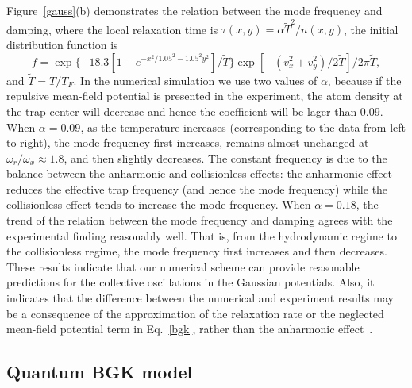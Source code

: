 Figure~\ref{gauss}(b) demonstrates the relation between the mode
frequency and damping, where the local relaxation time is
$\tau(x,y)=\alpha \widetilde{T}^2/n(x,y)$, the initial
distribution function is
\begin{equation}
f=\exp\{-18.3[1-e^{-x^2/1.05^2-1.05^2y^2}]/\widetilde{T}\}\exp[-(v_x^2+v_y^2)/2\widetilde{T}]/2\pi\widetilde{T},
\end{equation}
and $\widetilde{T}=T/T_F$. {In the numerical simulation we use two
	values of $\alpha$, because if the repulsive mean-field potential
	is presented in the experiment, the atom density at the trap
	center will decrease and hence the coefficient will be lager than
	$0.09$. When $\alpha=0.09$, as the temperature increases
	(corresponding to the data from left to right), the mode frequency
	first increases, remains almost unchanged at
	$\omega_r/\omega_x\approx1.8$, and then slightly decreases. The
	constant frequency is due to the balance between the anharmonic
	and collisionless effects: the anharmonic effect reduces the
	effective trap frequency (and hence the mode frequency) while the
	collisionless effect tends to increase the mode frequency. When
	$\alpha=0.18$, the trend of the relation between the mode
	frequency and damping agrees with the experimental finding
	reasonably well. That is, from the hydrodynamic regime to the
	collisionless regime, the mode frequency first increases and then
	decreases. These results indicate that our numerical scheme can
	provide reasonable predictions for the collective oscillations in
	the Gaussian potentials. Also, it indicates that the difference
	between the numerical and experiment results may be a consequence
	of the approximation of the relaxation rate or the neglected
	mean-field potential term in Eq.~\eqref{bgk}, rather than the
	anharmonic effect~\cite{Riedl2008}.}



\subsection{Quantum BGK model}


